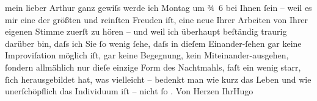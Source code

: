 \pstart{}mein lieber Arthur\pend\vspace{0.5em}
\pstart
           ganz gewiſs werde ich Montag um ¾ 6 bei Ihnen{ }ſein – weil
               es mir eine der größten und reinſten Freuden iſt, eine neue Ihrer Arbeiten von Ihrer eigenen Stimme zuerſt zu
               hören – und weil ich überhaupt beſtändig {\pb}traurig darüber bin, daſs ich Sie{ }ſo wenig{ }ſehe, daſs in dieſem Einander-ſehen gar keine Improviſation möglich iſt, gar
               keine Begegnung, kein Miteinander-ausgehen,{ }ſondern allmählich nur dieſe einzige Form
               des Nachtmahls, faſt ein wenig starr,{ }ſich herausgebildet hat, was vielleicht –
               bedenkt man wie kurz das Leben und wie unerſchöpflich das Individuum iſt – nicht{ }ſo
                  \label{T_L02113-1v}\label{T_L02113-1}.\pend
           \pstart Von Herzen Ihr\spacefill\mbox{Hugo}\pend{}\endnumbering{}  \newcommand{\dateiname}{L02113}\newcommand{\titel}{Hugo von Hofmannsthal an Arthur Schnitzler, [21. 2. 1913]}\newcommand{\editorInnen}{Martin Anton Müller und Gerd-Hermann Susen}
